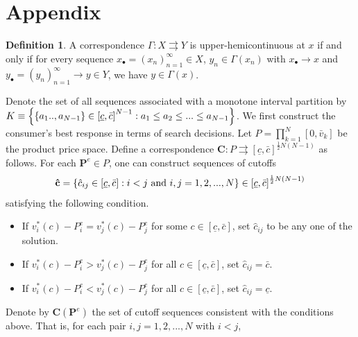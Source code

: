 \documentclass[14pt]{article}
\theoremstyle{plain}
\theoremstyle{definition}
\newtheorem{defn}{Definition}[section]
\theoremstyle{remark}
\DeclareRobustCommand\1{\futurelet\oneNext\oneCheck}
\begin{document}
 



\cleardoublepage
\appendix


\section{Appendix}

\begin{defn}
A correspondence $\Gamma:X\rightrightarrows Y$ is upper-hemicontinuous at $x$ 
if and only if for every sequence $x_{\bullet}=(x_n)_{n=1}^{\infty}\in X$, $y_n\in \Gamma(x_n)$ with $x_{\bullet} \to x$ and $y_{\bullet}=(y_n)_{n=1}^{\infty} \to y\in Y$, we have $y\in \Gamma(x)$.
\end{defn}

Denote the set of all sequences associated with a monotone interval partition by $
K\equiv \left\{ \left\{ a_{1}..,a_{N-1}\right\} \in \left[ \underline{c},\bar{%
c}\right] ^{N-1}:a_{1}\leq a_{2}\leq ...\leq a_{N-1} \right\} $. We first construct the consumer's best response in terms of search decisions.
Let $P=\prod_{k=1}^{N}\left[ 0,\bar{v}_{k}\right] $ be the product price
space. Define a correspondence $\mathbf{C}:P\rightrightarrows \left[ 
\underline{c},\bar{c}\right] ^{\frac{1}{2}N\left( N-1\right) }$ as follows. For each $\mathbf{P}^{e}\in P$, one can construct sequences of cutoffs \[\mathbf{\hat{c}}=\left\{ \hat{c}_{ij}\in \left[ \underline{c},\bar{c}\right]
: i<j\text{ and } i,j=\\ 1,2,...,N\right\} \in \left[ \underline{c},\bar{c}\right]
^{\frac{1}{2}N\left( N-1\right) } \]
satisfying the following condition.
\begin{itemize}
\item If $v_{i}^{\ast }\left( c\right) -P_{i}^{e}=v_{j}^{\ast }\left(
c\right) -P_{j}^{e}$ for some $c\in \left[ \underline{c},\bar{c}\right] $,
set $\hat{c}_{ij}$ to be any one of the solution.

\item If $v_{i}^{\ast }\left( c\right) -P_{i}^{e}>v_{j}^{\ast }\left(
c\right) -P_{j}^{e}$ for all $c\in \left[ \underline{c},\bar{c}\right] $,
set $\hat{c}_{ij}=\bar{c}$.

\item If $v_{i}^{\ast }\left( c\right) -P_{i}^{e}<v_{j}^{\ast }\left(
c\right) -P_{j}^{e}$ for all $c\in \left[ \underline{c},\bar{c}\right] $,
set $\hat{c}_{ij}=\underline{c}$.
\end{itemize}

Denote by $\mathbf{C}\left( \mathbf{P}^{e}\right) $ the set of cutoff
sequences consistent with the conditions above. That is, for each pair $%
i,j=1,2,...,N$ with $i<j$, 
\end{document}
